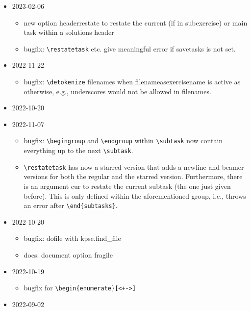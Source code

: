 \documentclass[DIV12,BCOR0mm]{scrartcl}
\newcommand{\optionstyle}{\normalfont\ttfamily\color{red!50!black}}
\newcommand{\option}[1]{{\optionstyle #1}}
\newcommand{\vers}[1]{{\normalfont\ttfamily\color{black!90} #1}}
\newcommand{\versitem}[1][]{\item[v. \vers{#1}]}
\newcommand{\luadisp}[1]{{\normalfont\ttfamily\color{cyan!50!black}#1}}
\begin{document}
\begin{itemize}
\begin{itemize}
      \end{itemize}
    \versitem[0.14:]  2023-02-06
      \begin{itemize}
        \item new option \option{headerrestate} to restate
        the current (if in subexercise) or main task within
        a solutions header
        \item bugfix: \lstinline|\restatetask| etc. give meaningful error if \option{savetasks} is not set.
      \end{itemize}
    \versitem[0.13.1:]  2022-11-22
      \begin{itemize}
        \item bugfix: \lstinline|\detokenize| filenames when
          \option{filenameasexercisename} is active as otherwise,
          e.g., underscores would not be allowed in filenames.
      \end{itemize}
    \versitem[0.12.2:]  2022-10-20
    \versitem[0.13:]  2022-11-07
      \begin{itemize}
        \item bugfix: \lstinline|\begingroup| and \lstinline|\endgroup|
          within \lstinline|\subtask| now contain everything up to the
          next \lstinline|\subtask|.
        \item \lstinline|\restatetask| has now a starred version that
          adds a newline and beamer versions for both the
          regular and the starred version. Furthermore, there
          is an argument \option{cur} to restate the current
          subtask (the one just given before). This is only
          defined within the aforementioned group, i.e.,
          throws an error after \lstinline|\end{subtasks}|.
      \end{itemize}
    \versitem[0.12.2:]  2022-10-20
      \begin{itemize}
        \item bugfix: \luadisp{dofile} with
        \luadisp{kpse.find\_file}
        \item docs: document option \option{fragile}
      \end{itemize}
  \versitem[0.12.1:]  2022-10-19
      \begin{itemize}
        \item bugfix for \lstinline|\begin{enumerate}[<+->]|
      \end{itemize}
  \versitem[0.12:]  2022-09-02
      \begin{itemize}

\end{itemize}
\end{itemize}
\end{document}
